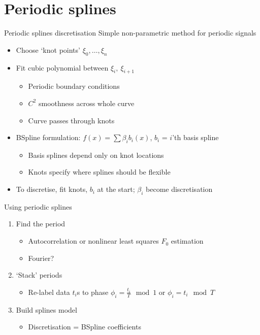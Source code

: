 \documentclass[presentation]{beamer}
\begin{document}
\section{Periodic splines}
\label{sec:org8388161}

\begin{frame}[label={sec:orgdb8c5ec}]{Periodic splines discretisation}
Simple non-parametric method for periodic signals

\begin{itemize}[<+->]
\item Choose `knot points' \(\xi_0, \dots, \xi_n\)
\item Fit cubic polynomial between \(\xi_i,~\xi_{i+1}\)
\begin{itemize}
\item Periodic boundary conditions
\item \(C^2\) smoothness across whole curve
\item Curve passes through knots
\end{itemize}
\item BSpline formulation: \(f(x) = \sum \beta_i b_i(x)\), \(b_i\) = \(i\)'th basis spline
\begin{itemize}
\item Basis splines depend only on knot locations
\item Knots specify where splines should be flexible
\end{itemize}
\item To discretise, fit knots, \(b_i\) at the start; \(\beta_i\) become discretisation
\end{itemize}
\end{frame}

\begin{frame}[label={sec:orgf3ac545}]{Using periodic splines}
\vfill
\begin{enumerate}[<+->]
\item Find the period
\begin{itemize}
\item Autocorrelation or nonlinear least squares \(F_0\) estimation
\item Fourier?
\end{itemize}
\item `Stack' periods
\begin{itemize}
\item Re-label data \(t_i\)s to phase \(\phi_i = \frac{t_i}{T} \mod 1\) or \(\phi_i = t_i \mod T\)
\end{itemize}
\item Build splines model
\begin{itemize}
\item Discretisation = BSpline coefficients
\end{itemize}
\end{enumerate}
\end{frame}
\end{document}
